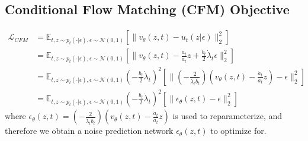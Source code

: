 \subsection{Conditional Flow Matching (CFM) Objective}
\begin{align}
    \mathcal{L}_{CFM} &= \mathbb{E}_{t, z \sim p_t(\cdot \vert \epsilon), \epsilon \sim \mathcal{N}(0, 1)} \left[ \| v_\theta(z, t) - u_t(z \vert \epsilon) \|_2^2 \right]
    \\ &= \mathbb{E}_{t, z \sim p_t(\cdot \vert \epsilon), \epsilon \sim \mathcal{N}(0, 1)} \left[ \| v_\theta(z, t) - \frac{\dot{a}_t}{a_t} z + \frac{b_t}{2} \dot{\lambda}_t \epsilon \|_2^2 \right]
    \\ &= \mathbb{E}_{t, z \sim p_t(\cdot \vert \epsilon), \epsilon \sim \mathcal{N}(0, 1)} \left( -\frac{b_t}{2} \dot{\lambda}_t\right)^2 \left[ \| (-\frac{2}{\dot{\lambda}_t b_t}) (v_\theta(z, t) - \frac{\dot{a}_t}{a_t} z) - \epsilon \|_2^2 \right]
    \\ &= \mathbb{E}_{t, z \sim p_t(\cdot \vert \epsilon), \epsilon \sim \mathcal{N}(0, 1)} \left( -\frac{b_t}{2} \dot{\lambda}_t\right)^2 \left[ \| \epsilon_\theta (z, t) - \epsilon \|_2^2 \right]
\end{align}
where $\epsilon_\theta (z, t) = (-\frac{2}{\dot{\lambda}_t b_t}) (v_\theta(z, t) - \frac{\dot{a}_t}{a_t} z)$ is used to reparameterize, and therefore we obtain a noise prediction network $\epsilon_\theta (z, t)$ to optimize for.

